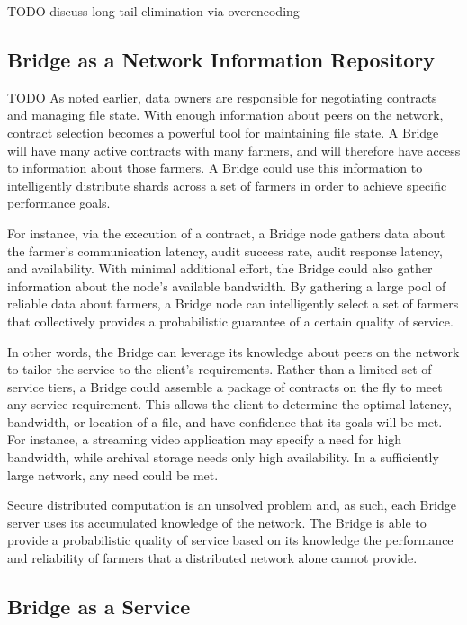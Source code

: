 \documentclass[a4paper,10pt]{article} \usepackage[utf8]{inputenc}
\newcommand{\todo}[1]{{\color{red} TODO #1}}
\begin{document}
\todo{discuss long tail elimination via overencoding}


\subsection{Bridge as a Network Information Repository}

\todo{ As noted earlier, data owners are responsible for negotiating contracts
and managing file state. With enough information about peers on the network,
contract selection becomes a powerful tool for maintaining file state. A Bridge
will have many active contracts with many farmers, and will therefore have
access to information about those farmers. A Bridge could use this information
to intelligently distribute shards across a set of farmers in order to achieve
specific performance goals.

For instance, via the execution of a contract, a Bridge node gathers data about
the farmer’s communication latency, audit success rate, audit response latency,
and availability. With minimal additional effort, the Bridge could also gather
information about the node’s available bandwidth. By gathering a large pool of
reliable data about farmers, a Bridge node can intelligently select a set of
farmers that collectively provides a probabilistic guarantee of a certain
quality of service.

In other words, the Bridge can leverage its knowledge about peers on the network
to tailor the service to the client’s requirements. Rather than a limited set of
service tiers, a Bridge could assemble a package of contracts on the fly to meet
any service requirement. This allows the client to determine the optimal
latency, bandwidth, or location of a file, and have confidence that its goals
will be met. For instance, a streaming video application may specify a need for
high bandwidth, while archival storage needs only high availability. In a
sufficiently large network, any need could be met.

Secure distributed computation is an unsolved problem and, as such, each Bridge
server uses its accumulated knowledge of the network. The Bridge is able to
provide a probabilistic quality of service based on its knowledge the
performance and reliability of farmers that a distributed network alone cannot
provide. }

\subsection{Bridge as a Service}
\end{document}
